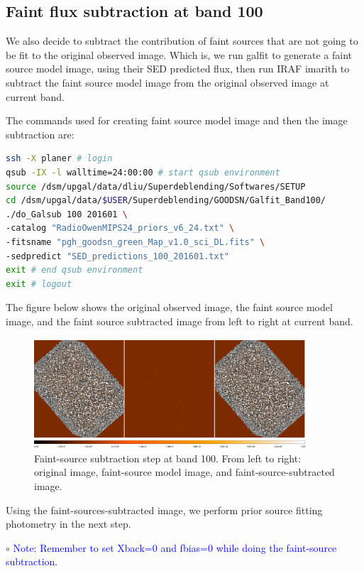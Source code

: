 \documentclass[11pt,a4paper]{article}
\begin{document}
\subsection{Faint flux subtraction at band 100}
\label{Band100_Galsub}


We also decide to subtract the contribution of faint sources that are not going to be fit to the original observed image. Which is, we run galfit to generate a faint source model image, using their SED predicted flux, then run IRAF imarith to subtract the faint source model image from the original observed image at current band. 

The commands used for creating faint source model image and then the image subtraction are:

\begin{lstlisting}[language=bash]
ssh -X planer # login
qsub -IX -l walltime=24:00:00 # start qsub environment
source /dsm/upgal/data/dliu/Superdeblending/Softwares/SETUP
cd /dsm/upgal/data/$USER/Superdeblending/GOODSN/Galfit_Band100/
./do_Galsub 100 201601 \
-catalog "RadioOwenMIPS24_priors_v6_24.txt" \
-fitsname "pgh_goodsn_green_Map_v1.0_sci_DL.fits" \
-sedpredict "SED_predictions_100_201601.txt"
exit # end qsub environment
exit # logout
\end{lstlisting}

The figure below shows the original observed image, the faint source model image, and the faint source subtracted image from left to right at current band. 

\begin{figure}[H]
	\caption{Faint-source subtraction step at band 100. From left to right: original image, faint-source model image, and faint-source-subtracted image.}
	\includegraphics[width=0.9\textwidth]{galfit_100_FIT_goodsn_100_Map_201512_Galsub}
\end{figure}

Using the faint-sources-subtracted image, we perform prior source fitting photometry in the next step. 

\indent\hspace{15pt}$\circ$ 
\textcolor{blue}{Note: Remember to set Xback=0 and fbias=0 while doing the faint-source subtraction.}
\\
\end{document}
